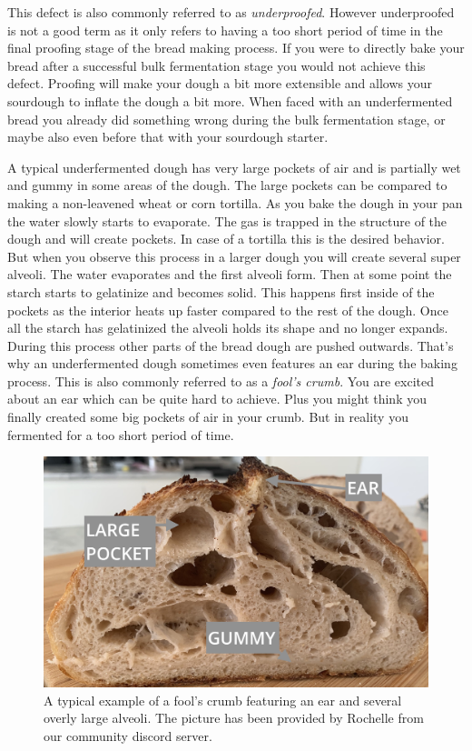 This defect is also commonly referred to as {\it underproofed}. However underproofed
is not a good term as it only refers to having a too short period of time in the final
proofing stage of the bread making process. If you were to directly bake your bread
after a successful bulk fermentation stage you would not achieve this defect.
Proofing will make your dough a bit more extensible and allows your sourdough
to inflate the dough a bit more. When faced with an underfermented bread you
already did something wrong during the bulk fermentation stage, or maybe also
even before that with your sourdough starter.

A typical underfermented dough has very large pockets of air and is partially
wet and gummy in some areas of the dough. The large pockets can be compared
to making a non-leavened wheat or corn tortilla. As you bake the dough in your pan
the water slowly starts to evaporate. The gas is trapped in the structure of the dough
and will create pockets. In case of a tortilla this is the desired behavior.
But when you observe this process in a larger dough you will create several
super alveoli. The water evaporates and the first alveoli form. Then at some point
the starch starts to gelatinize and becomes solid. This happens first inside of the pockets
as the interior heats up faster compared to the rest of the dough. Once all the starch
has gelatinized the alveoli holds its shape and no longer expands. During this
process other parts of the bread dough are pushed outwards. That's why an underfermented
dough sometimes even features an ear during the baking process. This
is also commonly referred to as a {\it fool's crumb}. You are excited about an ear which
can be quite hard to achieve. Plus you might think you finally created some big pockets
of air in your crumb. But in reality you fermented for a too short period
of time.

\begin{figure}
  \includegraphics[width=\textwidth]{fools-crumb}
  \caption{A typical example of a fool's crumb featuring an ear and several overly
  large alveoli. The picture has been provided by Rochelle from our
  community discord server.}
  \label{fools-crumb}
\end{figure}

